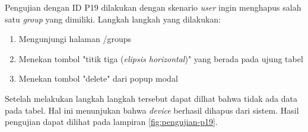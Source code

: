 Pengujian dengan ID P19 dilakukan dengan skenario \textit{user} ingin menghapus salah satu \textit{group} yang dimiliki. Langkah langkah yang dilakukan:
\begin{enumerate}
  \item Mengunjungi halaman /groups
  \item Menekan tombol "titik tiga (\textit{elipsis horizontal})" yang berada pada ujung tabel
  \item Menekan tombol "delete" dari popup modal
\end{enumerate}

Setelah melakukan langkah langkah tersebut dapat dilhat bahwa tidak ada data pada tabel. Hal ini menunjukan bahwa \textit{device} berhasil dihapus dari sistem. Hasil pengujian dapat dilihat pada lampiran \ref{fig:pengujian-p19}.